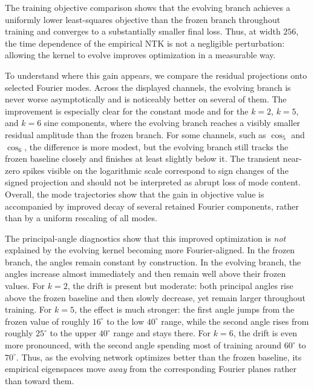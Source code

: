 \documentclass[11pt]{article}
\begin{document}
The training objective comparison shows that the evolving branch achieves a uniformly lower least-squares objective than the frozen branch throughout training and converges to a substantially smaller final loss. Thus, at width \(256\), the time dependence of the empirical NTK is not a negligible perturbation: allowing the kernel to evolve improves optimization in a measurable way.

To understand where this gain appears, we compare the residual projections onto selected Fourier modes. Across the displayed channels, the evolving branch is never worse asymptotically and is noticeably better on several of them. The improvement is especially clear for the constant mode and for the \(k=2\), \(k=5\), and \(k=6\) sine components, where the evolving branch reaches a visibly smaller residual amplitude than the frozen branch. For some channels, such as \(\cos_5\) and \(\cos_6\), the difference is more modest, but the evolving branch still tracks the frozen baseline closely and finishes at least slightly below it. The transient near-zero spikes visible on the logarithmic scale correspond to sign changes of the signed projection and should not be interpreted as abrupt loss of mode content. Overall, the mode trajectories show that the gain in objective value is accompanied by improved decay of several retained Fourier components, rather than by a uniform rescaling of all modes.

The principal-angle diagnostics show that this improved optimization is \emph{not} explained by the evolving kernel becoming more Fourier-aligned. In the frozen branch, the angles remain constant by construction. In the evolving branch, the angles increase almost immediately and then remain well above their frozen values. For \(k=2\), the drift is present but moderate: both principal angles rise above the frozen baseline and then slowly decrease, yet remain larger throughout training. For \(k=5\), the effect is much stronger: the first angle jumps from the frozen value of roughly \(16^\circ\) to the low \(40^\circ\) range, while the second angle rises from roughly \(25^\circ\) to the upper \(40^\circ\) range and stays there. For \(k=6\), the drift is even more pronounced, with the second angle spending most of training around \(60^\circ\) to \(70^\circ\). Thus, as the evolving network optimizes better than the frozen baseline, its empirical eigenspaces move \emph{away} from the corresponding Fourier planes rather than toward them.
\end{document}
